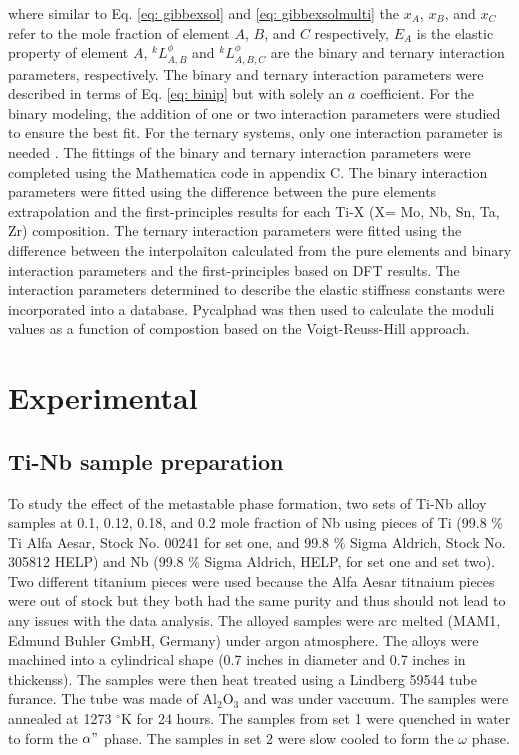 \noindent where similar to Eq. \ref{eq: gibbexsol} and \ref{eq: gibbexsolmulti} the $x_A$, $x_B$, and $x_C$ refer to the mole fraction of element $A$, $B$, and $C$ respectively, $E_{A}$ is the elastic property of element $A$, $^{k}L_{A,B}^{\phi}$ and $^{k}L_{A,B,C}^{\phi}$ are the binary and ternary interaction parameters, respectively. The binary and ternary interaction parameters were described in terms of Eq. \ref{eq: binip} but with solely an $a$ coefficient. For the binary modeling, the addition of one or two interaction parameters were studied to ensure the best fit. For the ternary systems, only one interaction parameter is needed \cite{Liu2009,Saunders1998,Lukas2007}. The fittings of the binary and ternary interaction parameters were completed using the Mathematica code in appendix C. The binary interaction parameters were fitted using the difference between the pure elements extrapolation and the first-principles results for each Ti-X (X= Mo, Nb, Sn, Ta, Zr) composition. The ternary interaction parameters were fitted using the difference between the interpolaiton calculated from the pure elements and binary interaction parameters and the first-principles based on DFT results. The interaction parameters determined to describe the elastic stiffness constants were incorporated into a database. Pycalphad \cite{Otis2017} was then used to calculate the moduli values as a function of compostion based on the Voigt-Reuss-Hill approach.


\section{Experimental}

\subsection{Ti-Nb sample preparation}

To study the effect of the metastable phase formation, two sets of Ti-Nb alloy samples at 0.1, 0.12, 0.18, and 0.2 mole fraction of Nb using pieces of Ti (99.8 \% Ti Alfa Aesar, Stock No. 00241 for set one, and 99.8 \% Sigma Aldrich, Stock No. 305812 HELP) and Nb (99.8 \% Sigma Aldrich, HELP, for set one and set two). Two different titanium pieces were used because the Alfa Aesar titnaium pieces were out of stock but they both had the same purity and thus should not lead to any issues with the data analysis. The alloyed samples were arc melted (MAM1, Edmund Buhler GmbH, Germany) under argon atmosphere. The alloys were machined into a cylindrical shape (0.7 inches in diameter and 0.7 inches in thickenss). The samples were then heat treated using a Lindberg 59544 tube furance. The tube was made of Al$_{2}$O$_{3}$ and was under vaccuum. The samples were annealed at 1273 $^\circ$K for 24 hours. The samples from set 1 were quenched in water to form the $\alpha"$ phase. The samples in set 2 were slow cooled to form the $\omega$ phase. 

